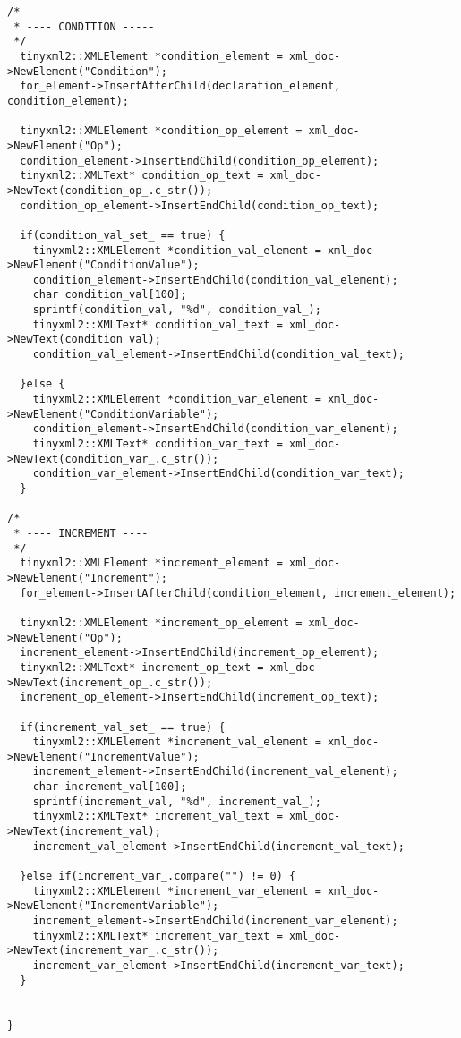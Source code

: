 \documentclass[a4paper,10pt,twoside]{book}
\begin{document}
\begin{lstlisting}[language=CCC, caption=pragma\_handler/ForNode.cpp]
/*
 * ---- CONDITION -----
 */ 
  tinyxml2::XMLElement *condition_element = xml_doc->NewElement("Condition");
  for_element->InsertAfterChild(declaration_element, condition_element); 
  
  tinyxml2::XMLElement *condition_op_element = xml_doc->NewElement("Op");
  condition_element->InsertEndChild(condition_op_element);
  tinyxml2::XMLText* condition_op_text = xml_doc->NewText(condition_op_.c_str());
  condition_op_element->InsertEndChild(condition_op_text);

  if(condition_val_set_ == true) {
    tinyxml2::XMLElement *condition_val_element = xml_doc->NewElement("ConditionValue");
    condition_element->InsertEndChild(condition_val_element);
    char condition_val[100];
    sprintf(condition_val, "%d", condition_val_);
    tinyxml2::XMLText* condition_val_text = xml_doc->NewText(condition_val);
    condition_val_element->InsertEndChild(condition_val_text);
  
  }else {
    tinyxml2::XMLElement *condition_var_element = xml_doc->NewElement("ConditionVariable");
    condition_element->InsertEndChild(condition_var_element);
    tinyxml2::XMLText* condition_var_text = xml_doc->NewText(condition_var_.c_str());
    condition_var_element->InsertEndChild(condition_var_text);
  }

/*
 * ---- INCREMENT ----
 */
  tinyxml2::XMLElement *increment_element = xml_doc->NewElement("Increment");
  for_element->InsertAfterChild(condition_element, increment_element); 

  tinyxml2::XMLElement *increment_op_element = xml_doc->NewElement("Op");
  increment_element->InsertEndChild(increment_op_element);
  tinyxml2::XMLText* increment_op_text = xml_doc->NewText(increment_op_.c_str());
  increment_op_element->InsertEndChild(increment_op_text);

  if(increment_val_set_ == true) {
    tinyxml2::XMLElement *increment_val_element = xml_doc->NewElement("IncrementValue");
    increment_element->InsertEndChild(increment_val_element);
    char increment_val[100];
    sprintf(increment_val, "%d", increment_val_);
    tinyxml2::XMLText* increment_val_text = xml_doc->NewText(increment_val);
    increment_val_element->InsertEndChild(increment_val_text);

  }else if(increment_var_.compare("") != 0) {
    tinyxml2::XMLElement *increment_var_element = xml_doc->NewElement("IncrementVariable");
    increment_element->InsertEndChild(increment_var_element);
    tinyxml2::XMLText* increment_var_text = xml_doc->NewText(increment_var_.c_str());
    increment_var_element->InsertEndChild(increment_var_text);
  }


}
\end{lstlisting}
\end{document}
